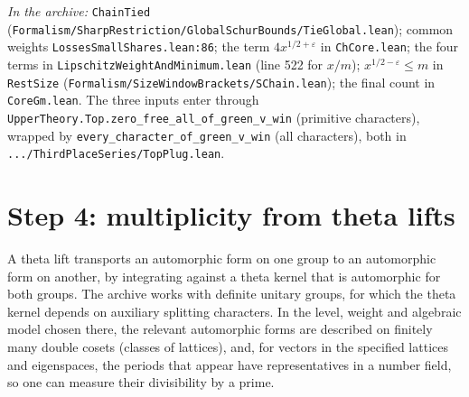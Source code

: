 \documentclass[11pt]{article}
\newcommand{\Lean}[1]{\texttt{\small #1}}
\newcommand{\inarch}[1]{\par{\small\raggedright\noindent\emph{In the archive:} #1\par}}
\begin{document}
\inarch{\Lean{ChainTied} (\Lean{Formalism/SharpRestriction/GlobalSchurBounds/TieGlobal.lean}); common weights \Lean{LossesSmallShares.lean:86}; the term $4x^{1/2+\varepsilon}$ in \Lean{ChCore.lean}; the four terms in \Lean{LipschitzWeightAndMinimum.lean} (line 522 for $x/m$); $x^{1/2-\varepsilon}\le m$ in \Lean{RestSize} (\Lean{Formalism/SizeWindowBrackets/SChain.lean}); the final count in \Lean{CoreGm.lean}. The three inputs enter through \Lean{UpperTheory.Top.zero\_free\_all\_of\_green\_v\_win} (primitive characters), wrapped by \Lean{every\_character\_of\_green\_v\_win} (all characters), both in \Lean{.../ThirdPlaceSeries/TopPlug.lean}.}

\section{Step 4: multiplicity from theta lifts}\label{sec:s4}
A theta lift transports an automorphic form on one group to an automorphic form on another, by integrating against a theta kernel that is automorphic for both groups. The archive works with definite unitary groups, for which the theta kernel depends on auxiliary splitting characters. In the level, weight and algebraic model chosen there, the relevant automorphic forms are described on finitely many double cosets (classes of lattices), and, for vectors in the specified lattices and eigenspaces, the periods that appear have representatives in a number field, so one can measure their divisibility by a prime.
\end{document}

